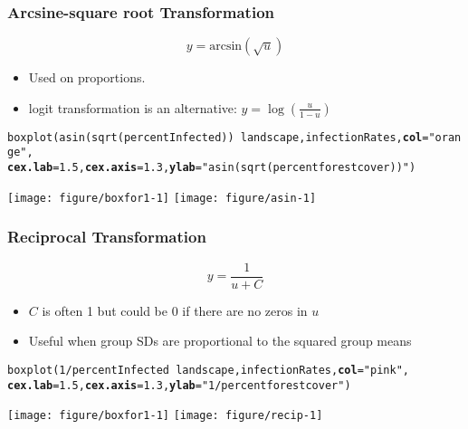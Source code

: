 \documentclass[color=usenames,dvipsnames]{beamer}\usepackage[]{graphicx}\usepackage[]{color}
\makeatletter
\newcommand{\hlnum}[1]{\textcolor[rgb]{0.69,0.494,0}{#1}}%
\newcommand{\hlstr}[1]{\textcolor[rgb]{0.749,0.012,0.012}{#1}}%
\newcommand{\hlopt}[1]{\textcolor[rgb]{0,0,0}{#1}}%
\newcommand{\hlstd}[1]{\textcolor[rgb]{0,0,0}{#1}}%
\newcommand{\hlkwc}[1]{\textcolor[rgb]{0,0,0}{\textbf{#1}}}%
\newcommand{\hlkwd}[1]{\textcolor[rgb]{0.004,0.004,0.506}{#1}}%
\newenvironment{kframe}{%
 \def\at@end@of@kframe{}%
 \ifinner\ifhmode%
  \def\at@end@of@kframe{\end{minipage}}%
  \begin{minipage}{\columnwidth}%
 \fi\fi%
 \def\FrameCommand##1{\hskip\@totalleftmargin \hskip-\fboxsep
 \colorbox{shadecolor}{##1}\hskip-\fboxsep
     \hskip-\linewidth \hskip-\@totalleftmargin \hskip\columnwidth}%
 \MakeFramed {\advance\hsize-\width
   \@totalleftmargin\z@ \linewidth\hsize
   \@setminipage}}%
 {\par\unskip\endMakeFramed%
 \at@end@of@kframe}
\newenvironment{knitrout}{}{} %
\makeatother
\begin{document}
\begin{frame}[fragile]
  \frametitle{Arcsine-square root Transformation}
  \small
  \[
  y = \mathrm{arcsin}(\sqrt{u})
  \]
  \vspace{-5mm}
  \begin{itemize}%
    \small
    \item Used on proportions.
    \item logit transformation is an alternative: $y = \log(\frac{u}{1-u})$
  \end{itemize}
  \pause
\begin{knitrout}\scriptsize
{}\color{fgcolor}\begin{kframe}
\begin{alltt}
\hlkwd{boxplot}\hlstd{(}\hlkwd{asin}\hlstd{(}\hlkwd{sqrt}\hlstd{(percentInfected))}\hlopt{~}\hlstd{landscape, infectionRates,} \hlkwc{col}\hlstd{=}\hlstr{"orange"}\hlstd{,}
        \hlkwc{cex.lab}\hlstd{=}\hlnum{1.5}\hlstd{,} \hlkwc{cex.axis}\hlstd{=}\hlnum{1.3}\hlstd{,} \hlkwc{ylab}\hlstd{=}\hlstr{"asin(sqrt(percent forest cover))"}\hlstd{)}
\end{alltt}
\end{kframe}
\end{knitrout}
\texttt{[image: figure/boxfor1-1]} \hfill
\texttt{[image: figure/asin-1]} \\
\end{frame}




\begin{frame}[fragile]
  \frametitle{Reciprocal Transformation}
  \small
  \[
  y = \frac{1}{u + C}
  \]
  \vspace{-5mm}
  \begin{itemize}%
    \small
    \item $C$ is often 1 but could be 0 if there are no zeros in $u$
    \item Useful when group SDs are proportional to the squared group means
  \end{itemize}
  \pause
\begin{knitrout}\scriptsize
{}\color{fgcolor}\begin{kframe}
\begin{alltt}
\hlkwd{boxplot}\hlstd{(}\hlnum{1}\hlopt{/}\hlstd{percentInfected}\hlopt{~}\hlstd{landscape, infectionRates,} \hlkwc{col}\hlstd{=}\hlstr{"pink"}\hlstd{,}
        \hlkwc{cex.lab}\hlstd{=}\hlnum{1.5}\hlstd{,} \hlkwc{cex.axis}\hlstd{=}\hlnum{1.3}\hlstd{,} \hlkwc{ylab}\hlstd{=}\hlstr{"1/percent forest cover"}\hlstd{)}
\end{alltt}
\end{kframe}
\end{knitrout}
\texttt{[image: figure/boxfor1-1]} \hfill
\texttt{[image: figure/recip-1]} \\
\end{frame}
\end{document}
